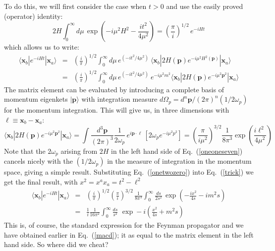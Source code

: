 \documentclass{article}
\def\eq#1{{Eq.~(\ref{#1})}}
\def\frab#1#2{\left(\frac{#1}{#2}\right)}
\def\ket#1{|#1\rangle}                    %
\def\bk#1#2#3{{\langle #1|#2|#3\rangle}}  %
\begin{document}
To do this, we will first consider the case when $t>0$ and use the easily proved (operator) identity:
\begin{equation}
 2H\int_0^\infty d\mu \, \exp\left( - i\mu^2 H^2 - \frac{i t^2}{4\mu^2}\right) =  \frab{\pi}{i}^{1/2}\,  e^{-iHt}
 \label{oneoneseven}
\end{equation} 
which allows us to  write:
\begin{eqnarray}
 \bk{\bm{x}_b}{e^{-iHt}}{\bm{x}_a} &=&  \frab{i}{\pi}^{1/2}  \int_0^\infty d\mu \, e^{(-it^2/4\mu^2)}\ \bk{\bm{x}_b}{2H(\bm{p}) e^{-i\mu^2H^2(\bm{p})}}{\bm{x}_a}\nonumber\\
 &=&\frab{i}{\pi}^{1/2}  \int_0^\infty d\mu \, e^{(-it^2/4\mu^2)}\ e^{-i\mu^2m^2}\bk{\bm{x}_b}{2H(\bm{p}) e^{-i\mu^2\bm{p}^2}}{\bm{x}_a}
 \label{trick}
\end{eqnarray} 
The matrix element can be evaluated by introducing a complete basis of momentum eigenkets $\ket{\bm{p}}$ with integration measure $d\Omega_p=d^n\bm{p}/(2\pi)^n(1/2\omega_p)$ for the momentum integration. This will give us, in three dimensions with $\bm{\ell} \equiv \bm{x}_b - \bm{x}_a$:
\begin{equation}
\bk{\bm{x}_b}{2H(\bm{p})e^{-i\mu^2\bm{p}^2}}{\bm{x}_a} =
  \int \frac{d^3\bm{p}}{(2\pi)^3}\frac{1}{2\omega_p} \, e^{i\bm{p}\cdot  \bm{\ell}} \, [2\omega_p e^{-i \mu^2 p^2}] = \frab{\pi}{i\mu^2}^{3/2} \frac{1}{8\pi^3}\exp \left(\frac{i\bm{\ell}^2}{4\mu^2}\right)
  \label{onetwozero}
\end{equation} 
Note that the $2\omega_p$ arising from $2H$ in the left hand side of \eq{oneoneseven} cancels nicely with the $(1/2\omega_p)$ in the measure of integration in the momentum space, giving a simple result. Substituting \eq{onetwozero}
into \eq{trick} we get the final result, with $x^2 = x^ax_a=t^2  - \bm{\ell}^2$
\begin{eqnarray}
  \bk{\bm{x}_b}{e^{-iHt}}{\bm{x}_a} &=&  \frab{i}{\pi}^{1/2}  \frab{\pi}{i}^{3/2}\,\frac{1}{8\pi^3}\int_0^\infty \frac{ds}{2s^2} \, \exp\left( - \frac{ix^2}{4 s} - i m^2 s\right)\\
  &=& \frac{1}{i} \frac{1}{16\pi^2} \int_0^\infty\frac{ds}{s^2} \, \, \exp -i\left( \frac{x^2}{4 s} +  m^2 s\right)
  \label{oneoneight}
\end{eqnarray}
This is, of course, the standard expression for the Feynman propagator and we have obtained earlier in \eq{macd}; it as equal to the matrix element in the left hand side. So where did we cheat? 
\end{document}
